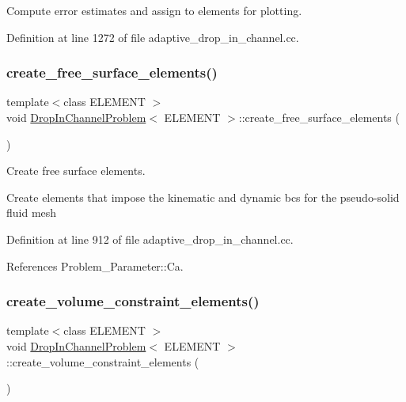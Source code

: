Compute error estimates and assign to elements for plotting. 

Definition at line 1272 of file adaptive\+\_\+drop\+\_\+in\+\_\+channel.\+cc.

\mbox{\label{classDropInChannelProblem_a73b989e3bedbd3630f576b0dba0f724f}} 
\subsubsection{\texorpdfstring{create\+\_\+free\+\_\+surface\+\_\+elements()}{create\_free\_surface\_elements()}}
{\footnotesize\ttfamily template$<$class E\+L\+E\+M\+E\+NT $>$ \\
void \hyperlink{classDropInChannelProblem}{Drop\+In\+Channel\+Problem}$<$ E\+L\+E\+M\+E\+NT $>$\+::create\+\_\+free\+\_\+surface\+\_\+elements (\begin{DoxyParamCaption}{ }\end{DoxyParamCaption})\hspace{0.3cm}{\ttfamily [private]}}



Create free surface elements. 

Create elements that impose the kinematic and dynamic bcs for the pseudo-\/solid fluid mesh 

Definition at line 912 of file adaptive\+\_\+drop\+\_\+in\+\_\+channel.\+cc.



References Problem\+\_\+\+Parameter\+::\+Ca.

\mbox{\label{classDropInChannelProblem_a53b96cd50b4e6c9bee294b8fb7dd51bd}} 
\subsubsection{\texorpdfstring{create\+\_\+volume\+\_\+constraint\+\_\+elements()}{create\_volume\_constraint\_elements()}}
{\footnotesize\ttfamily template$<$class E\+L\+E\+M\+E\+NT $>$ \\
void \hyperlink{classDropInChannelProblem}{Drop\+In\+Channel\+Problem}$<$ E\+L\+E\+M\+E\+NT $>$\+::create\+\_\+volume\+\_\+constraint\+\_\+elements (\begin{DoxyParamCaption}{ }\end{DoxyParamCaption})\hspace{0.3cm}{\ttfamily [private]}}



